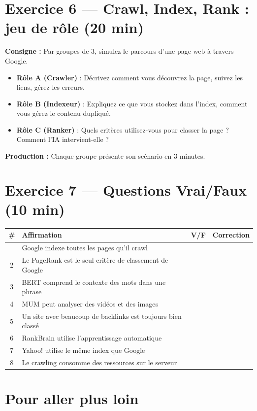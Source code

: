 \documentclass[12pt,a4paper]{report}
\begin{document}
\section{Exercice 6 --- Crawl, Index, Rank : jeu de r\^{o}le (20 min)}

\textbf{Consigne :} Par groupes de 3, simulez le parcours d'une page web \`{a} travers Google.

\begin{itemize}
    \item \textbf{R\^{o}le A (Crawler)} : D\'{e}crivez comment vous d\'{e}couvrez la page, suivez les liens, g\'{e}rez les erreurs.
    \item \textbf{R\^{o}le B (Indexeur)} : Expliquez ce que vous stockez dans l'index, comment vous g\'{e}rez le contenu dupliqu\'{e}.
    \item \textbf{R\^{o}le C (Ranker)} : Quels crit\`{e}res utilisez-vous pour classer la page ? Comment l'IA intervient-elle ?
\end{itemize}

\textbf{Production :} Chaque groupe pr\'{e}sente son sc\'{e}nario en 3 minutes.

\section{Exercice 7 --- Questions Vrai/Faux (10 min)}

\begin{longtable}{cp{5cm}cp{5cm}}
\toprule
\# & Affirmation & V/F & Correction \\
\midrule
\endhead
\bottomrule
\endfoot
1 & Google indexe toutes les pages qu'il crawl & & \\
2 & Le PageRank est le seul crit\`{e}re de classement de Google & & \\
3 & BERT comprend le contexte des mots dans une phrase & & \\
4 & MUM peut analyser des vid\'{e}os et des images & & \\
5 & Un site avec beaucoup de backlinks est toujours bien class\'{e} & & \\
6 & RankBrain utilise l'apprentissage automatique & & \\
7 & Yahoo! utilise le m\^{e}me index que Google & & \\
8 & Le crawling consomme des ressources sur le serveur & & \\
\bottomrule
\end{longtable}

\section{Pour aller plus loin}
\end{document}
